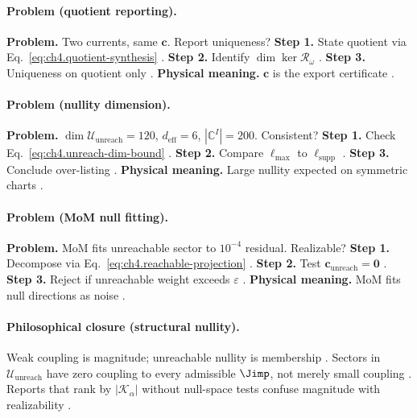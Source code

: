 \paragraph{Problem (quotient reporting).}
\textbf{Problem.} Two currents, same \(\mathbf{c}\). Report uniqueness?
\textbf{Step 1.} State quotient via Eq.~\eqref{eq:ch4.quotient-synthesis} \cite{harrington2001}.
\textbf{Step 2.} Identify \(\dim\ker\mathcal{R}_\omega\) \cite{stratton1941}.
\textbf{Step 3.} Uniqueness on quotient only \cite{devaney2004,hansen1988}.
\textbf{Physical meaning.} \(\mathbf{c}\) is the export certificate \cite{stratton1941}.

\paragraph{Problem (nullity dimension).}
\textbf{Problem.} \(\dim\mathcal{U}_{\mathrm{unreach}}=120\), \(d_{\mathrm{eff}}=6\), \(|\mathbb{C}^{I}|=200\). Consistent?
\textbf{Step 1.} Check Eq.~\eqref{eq:ch4.unreach-dim-bound} \cite{hansen1988,harrington2001}.
\textbf{Step 2.} Compare \(\ell_{\max}\) to \(\ell_{\mathrm{supp}}\) \cite{stratton1941,devaney2004}.
\textbf{Step 3.} Conclude over-listing \cite{jackson1999}.
\textbf{Physical meaning.} Large nullity expected on symmetric charts \cite{harrington2001}.

\paragraph{Problem (MoM null fitting).}
\textbf{Problem.} MoM fits unreachable sector to \(10^{-4}\) residual. Realizable?
\textbf{Step 1.} Decompose via Eq.~\eqref{eq:ch4.reachable-projection} \cite{harrington2001,stratton1941}.
\textbf{Step 2.} Test \(\mathbf{c}_{\mathrm{unreach}}=\mathbf{0}\) \cite{devaney2004}.
\textbf{Step 3.} Reject if unreachable weight exceeds \(\varepsilon\) \cite{hansen1988}.
\textbf{Physical meaning.} MoM fits null directions as noise \cite{harrington2001}.

\paragraph{Philosophical closure (structural nullity).}
Weak coupling is magnitude; unreachable nullity is membership \cite{hansen1988,harrington2001,stratton1941}. Sectors in \(\mathcal{U}_{\mathrm{unreach}}\)
have zero coupling to every admissible \(\Jimp\), not merely small coupling \cite{devaney2004}. Reports that rank by \(|\mathcal{K}_{\alpha}|\) without
null-space tests confuse magnitude with realizability \cite{harrington2001,hansen1988}.

